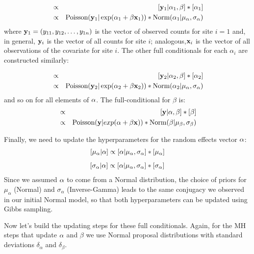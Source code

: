 \begin{eqnarray*}
[\alpha_1|\alpha_2,\alpha_3,\ldots,\alpha_i,\beta,{\bf y}_{1}] & \propto &   [{\bf y}_{1}|\alpha_1,\beta] * [\alpha_1] \\
	 & \propto  &   \mbox{Poisson}({\bf y}_{1}| \exp(\alpha_1 + \beta {\bf x}_1)) * \mbox{Norm}(\alpha_1|\mu_{\alpha} , \sigma_{\alpha})
\end{eqnarray*}
where ${\bf y}_{1} = (y_{11},y_{12}, \ldots, y_{1n})$ is the vector of
observed counts for site $i=1$ and, in general, ${\bf y}_{i}$ is the
vector of all counts for site $i$; analogous,${\bf x}_{i}$ is the
vector of all observations of the covariate for site $i$. The other full conditionals for
each $\alpha_{i}$ are constructed similarly:

\begin{eqnarray*}
[\alpha_2|\alpha_1,\alpha_3,\ldots,\alpha_i,\beta,{\bf y}_{2}] & \propto&  [{\bf y}_{2}|\alpha_2,\beta] * [\alpha_2] \\
	 & \propto  & \mbox{Poisson}({\bf y}_{2}| \exp(\alpha_2 + \beta {\bf x}_2)) * \mbox{Norm}(\alpha_2|\mu_{\alpha}, \sigma_{\alpha})
\end{eqnarray*}
and so on for all elements of ${\bf \alpha}$. The full-conditional for $\beta$ is:
\begin{eqnarray*}
[\beta|\alpha,{\bf y}] &\propto & [{\bf y}|\alpha,\beta] * [\beta] \\
	 &\propto& \mbox{Poisson}({\bf y}|exp(\alpha + \beta {\bf x})) *\mbox{Norm}(\beta|\mu_{\beta}, \sigma_{\beta})
\end{eqnarray*}

Finally, we need to update the hyperparameters for the random effects
vector ${\bf \alpha}$:
\[
[\mu_{\alpha}|{\bf \alpha}] \propto [{\bf \alpha}|\mu_{\alpha}, \sigma_{\alpha}] *[\mu_{\alpha}]
\]
\[
[\sigma_{\alpha}|{\bf\alpha}] \propto [\alpha|\mu_{\alpha}, \sigma_{\alpha}] *[\sigma_{\alpha}]
\]
Since we assumed ${\bf \alpha}$ to come from a Normal distribution, the choice of priors for $\mu_{\alpha}$ (Normal) and $\sigma_{\alpha}$ (Inverse-Gamma) leads to the same conjugacy we observed in our initial Normal model, so that both hyperparameters can be updated using Gibbs sampling.

Now let's build the updating steps for these full conditionals. Again, for the MH steps that update ${\bf \alpha}$ and $\beta$ we use Normal proposal distributions with standard deviations $\delta_{\alpha}$ and $\delta_{\beta}$.

